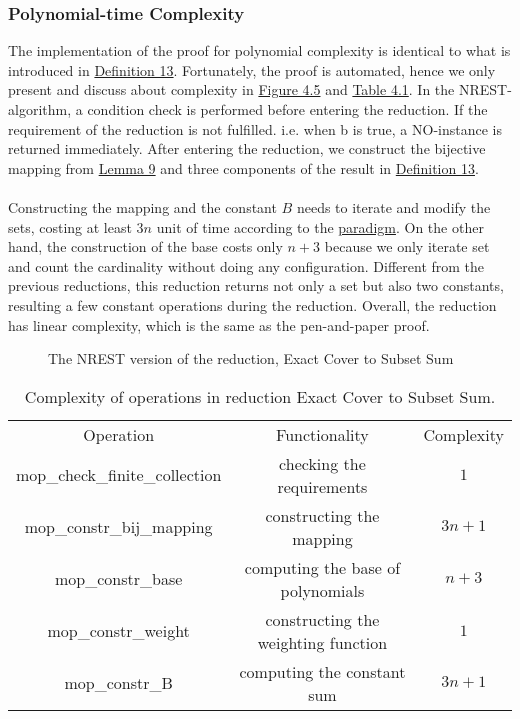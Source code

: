 \subsubsection{Polynomial-time Complexity}
The implementation of the proof for polynomial complexity is identical to what is introduced in \hyperref[def:13]{Definition 13}. 
Fortunately, the proof is automated, hence we only present and discuss about complexity in \hyperref[fig:4.5]{Figure 4.5} and \hyperref[table:4.1]{Table 4.1}.
In the NREST-algorithm, a condition check is performed before entering the reduction. 
If the requirement of the reduction is not fulfilled. i.e. when b is true, a NO-instance is returned immediately. 
After entering the reduction, we construct the bijective mapping from \hyperref[lemma:9]{Lemma 9} and three components of the result 
in \hyperref[def:13]{Definition 13}. \\\\
Constructing the mapping and the constant $B$ needs to iterate and modify the sets, 
costing at least $3n$ unit of time according to the \hyperref[para1]{paradigm}.  
On the other hand, the construction of the base costs only $n + 3$ because we only iterate set and count the cardinality without doing any configuration.
Different from the previous reductions, this reduction returns not only a set but also two constants,
resulting a few constant operations during the reduction. Overall, the reduction has linear complexity,
which is the same as the pen-and-paper proof.
\begin{figure}[!h]
    \caption{The NREST version of the reduction, Exact Cover to Subset Sum}
    \label{fig:4.5}
\end{figure}
\begin{table}[!h]
    \centering
    \begin{tabular}{| c | c | c |}
        \hline 
        Operation & Functionality & Complexity \\ 
        \hhline{|=|=|=|}
        mop\_check\_finite\_collection & checking the requirements & $1$ \\ 
        \hline
        mop\_constr\_bij\_mapping & constructing the mapping & $3n + 1$ \\ 
        \hline
        mop\_constr\_base & computing the base of polynomials & $n + 3$ \\ 
        \hline
        mop\_constr\_weight & constructing the weighting function & $1$\\ 
        \hline
        mop\_constr\_B & computing the constant sum & $3n + 1$ \\
        \hline
    \end{tabular}
    \caption{Complexity of operations in reduction Exact Cover to Subset Sum.}
    \label{table:4.1}
\end{table}

